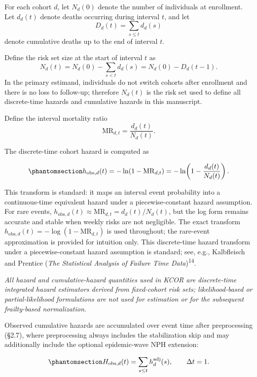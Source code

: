 \documentclass[
]{article}
\begin{document}
For each cohort \(d\), let \(N_d(0)\) denote the number of individuals
at enrollment. Let \(d_d(t)\) denote deaths occurring during interval
\(t\), and let \[
D_d(t) = \sum_{s \le t} d_d(s)
\] denote cumulative deaths up to the end of interval \(t\).

Define the risk set size at the start of interval \(t\) as \[
N_d(t) = N_d(0) - \sum_{s < t} d_d(s) = N_d(0) - D_d(t-1).
\] In the primary estimand, individuals do not switch cohorts after
enrollment and there is no loss to follow-up; therefore \(N_d(t)\) is
the risk set used to define all discrete-time hazards and cumulative
hazards in this manuscript.

Define the interval mortality ratio \[
\mathrm{MR}_{d,t} = \frac{d_d(t)}{N_d(t)}.
\]

The discrete-time cohort hazard is computed as

\begin{equation}\protect\phantomsection\label{eq:hazard-discrete}{
h_{\mathrm{obs},d}(t) = -\ln\!\left(1 - \mathrm{MR}_{d,t}\right) = -\ln\!\left(1 - \frac{d_d(t)}{N_d(t)}\right).
}\end{equation}

This transform is standard: it maps an interval event probability into a
continuous-time equivalent hazard under a piecewise-constant hazard
assumption. For rare events,
\(h_{\mathrm{obs},d}(t) \approx \mathrm{MR}_{d,t} = d_d(t)/N_d(t)\), but
the log form remains accurate and stable when weekly risks are not
negligible. The exact transform
\(h_{\mathrm{obs},d}(t) = -\log(1 - \mathrm{MR}_{d,t})\) is used
throughout; the rare-event approximation is provided for intuition only.
This discrete-time hazard transform under a piecewise-constant hazard
assumption is standard; see, e.g., Kalbfleisch and Prentice (\emph{The
Statistical Analysis of Failure Time Data})\textsuperscript{14}.

\emph{All hazard and cumulative-hazard quantities used in KCOR are
discrete-time integrated hazard estimators derived from fixed-cohort
risk sets; likelihood-based or partial-likelihood formulations are not
used for estimation or for the subsequent frailty-based normalization.}

Observed cumulative hazards are accumulated over event time after
preprocessing (§2.7), where preprocessing always includes the
stabilization skip and may additionally include the optional
epidemic-wave NPH extension:

\begin{equation}\protect\phantomsection\label{eq:cumhazard-observed}{
H_{\mathrm{obs},d}(t) = \sum_{s \le t} h_d^{\mathrm{adj}}(s),
\qquad \Delta t = 1.
}\end{equation}
\end{document}
